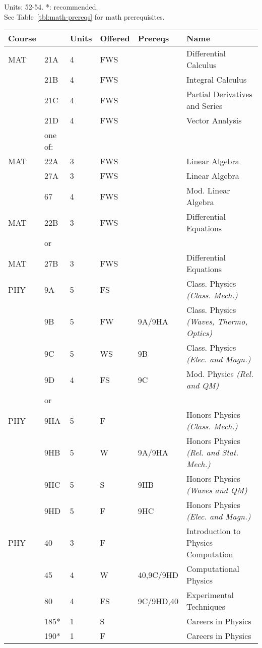 \documentclass[12pt]{article}
\begin{document}
\newpage
\vskip 2cm
\vskip 0.25cm
\noindent
Units:  52-54. *: recommended.\\
See Table~\ref{tbl:math-prereqs} for math prerequisites.\\
\begin{tabular}{|llllll|}
\hline
Course & & Units & Offered & Prereqs & Name \\
\hline
MAT & 21A & 4 & FWS & & Differential Calculus\\ 
    & 21B & 4 & FWS &  & Integral Calculus \\ 
    & 21C & 4 & FWS &  & Partial Derivatives and Series\\ 
    & 21D & 4 & FWS &  & Vector Analysis\\
\hline
    & one of:  & & & & \\
MAT & 22A & 3 & FWS &  & Linear Algebra\\
    & 27A & 3 & FWS &  & Linear Algebra\\
    & 67  & 4 & FWS &  & Mod. Linear Algebra\\
\hline
MAT & 22B & 3 & FWS &  & Differential Equations\\
    & or  & & & & \\
MAT & 27B & 3 & FWS &  & Differential Equations\\ 
\hline
\hline

PHY & 9A & 5 & FS &  & Class. Physics {\it (Class. Mech.)}\\
& 9B & 5 & FW & 9A/9HA    & Class. Physics {\it (Waves, Thermo, Optics)}\\
    & 9C & 5 & WS & 9B  & Class. Physics {\it (Elec. and Magn.)}\\ 
    & 9D & 4 & FS & 9C & Mod. Physics {\it (Rel. and QM)}\\ 
\hline
&or&&\\
\hline
PHY & 9HA & 5 & F &  & Honors Physics {\it (Class. Mech.)}\\ 
    & 9HB & 5 & W & 9A/9HA  & Honors Physics {\it (Rel. and Stat. Mech.)}\\ 
    & 9HC & 5 & S & 9HB  & Honors Physics {\it (Waves and QM)}\\ 
    & 9HD & 5 & F & 9HC   & Honors Physics {\it (Elec. and Magn.)}\\ 
\hline
\hline
PHY & 40  & 3 & F & & Introduction to Physics Computation \\ 
    & 45  & 4 & W & 40,9C/9HD & Computational Physics\\ 
    & 80  & 4 & FS & 9C/9HD,40        & Experimental Techniques \\
    & 185* & 1 & S & & Careers in Physics \\ 
    & 190* & 1 & F & & Careers in Physics \\ 
\hline
\end{tabular}\\
\end{document}
